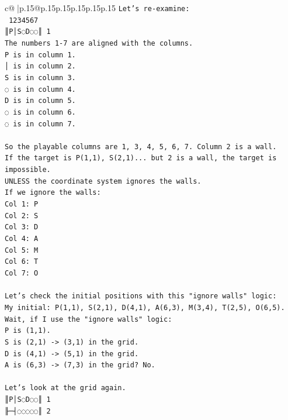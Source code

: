\documentclass{article}
\begin{document}
{\begin{supertabular}{c@{$\;$}|p{.15\linewidth}@{}p{.15\linewidth}p{.15\linewidth}p{.15\linewidth}p{.15\linewidth}p{.15\linewidth}}
{{{\texttt{Let's re{-}examine:} \\
\texttt{ 1234567} \\
\texttt{║P│S◌D◌◌║ 1} \\
\texttt{The numbers 1{-}7 are aligned with the columns.} \\
\texttt{P is in column 1.} \\
\texttt{│ is in column 2.} \\
\texttt{S is in column 3.} \\
\texttt{◌ is in column 4.} \\
\texttt{D is in column 5.} \\
\texttt{◌ is in column 6.} \\
\texttt{◌ is in column 7.} \\
\\ 
\texttt{So the playable columns are 1, 3, 4, 5, 6, 7. Column 2 is a wall.} \\
\texttt{If the target is P(1,1), S(2,1)... but 2 is a wall, the target is impossible.} \\
\texttt{UNLESS the coordinate system ignores the walls.} \\
\texttt{If we ignore the walls:} \\
\texttt{Col 1: P} \\
\texttt{Col 2: S} \\
\texttt{Col 3: D} \\
\texttt{Col 4: A} \\
\texttt{Col 5: M} \\
\texttt{Col 6: T} \\
\texttt{Col 7: O} \\
\\ 
\texttt{Let's check the initial positions with this "ignore walls" logic:} \\
\texttt{My initial: P(1,1), S(2,1), D(4,1), A(6,3), M(3,4), T(2,5), O(6,5).} \\
\texttt{Wait, if I use the "ignore walls" logic:} \\
\texttt{P is (1,1).} \\
\texttt{S is (2,1) {-}> (3,1) in the grid.} \\
\texttt{D is (4,1) {-}> (5,1) in the grid.} \\
\texttt{A is (6,3) {-}> (7,3) in the grid? No.} \\
\\ 
\texttt{Let's look at the grid again.} \\
\texttt{║P│S◌D◌◌║ 1} \\
\texttt{╟─┤◌◌◌◌◌║ 2} \\
}}}
\end{supertabular}}
\end{document}
